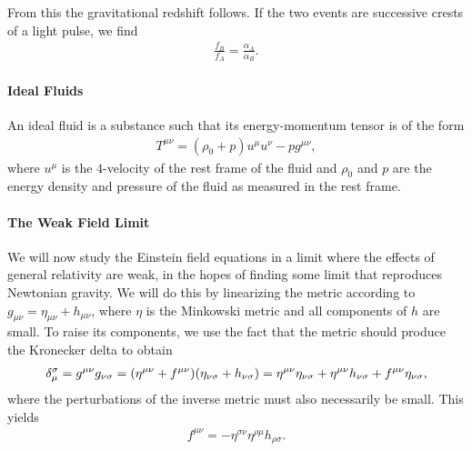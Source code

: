 From this the gravitational redshift follows. If the two events are successive crests of a light pulse, we find
\begin{align*}
	\frac{f_{B}}{f_{A}} = \frac{\alpha_{A}}{\alpha_{B}}.
\end{align*}

\paragraph{Ideal Fluids}
An ideal fluid is a substance such that its energy-momentum tensor is of the form
\begin{align*}
	T^{\mu\nu} = (\rho_{0} + p)u^{\mu}u^{\nu} - pg^{\mu\nu},
\end{align*}
where $u^{\mu}$ is the $4$-velocity of the rest frame of the fluid and $\rho_{0}$ and $p$ are the energy density and pressure of the fluid as measured in the rest frame.

\paragraph{The Weak Field Limit}
We will now study the Einstein field equations in a limit where the effects of general relativity are weak, in the hopes of finding some limit that reproduces Newtonian gravity. We will do this by linearizing the metric according to $g_{\mu\nu} = \eta_{\mu\nu} + h_{\mu\nu}$, where $\eta$ is the Minkowski metric and all components of $h$ are small. To raise its components, we use the fact that the metric should produce the Kronecker delta to obtain
\begin{align*}
	\kdelta{\mu}{\sigma} = g^{\mu\nu}g_{\nu\sigma} = (\eta^{\mu\nu} + f^{\mu\nu})(\eta_{\nu\sigma} + h_{\nu\sigma}) = \eta^{\mu\nu}\eta_{\nu\sigma} + \eta^{\mu\nu}h_{\nu\sigma} + f^{\mu\nu}\eta_{\nu\sigma},
\end{align*}
where the perturbations of the inverse metric must also necessarily be small. This yields
\begin{align*}
	f^{\mu\nu} = -\eta^{\sigma\nu}\eta^{\rho\mu}h_{\rho\sigma}.
\end{align*}

